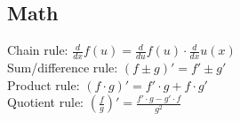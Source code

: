 \subsection{Math}
Chain rule: $\frac{d}{dx} f(u) = \frac{d}{du} f(u) \cdot \frac{d}{dx} u(x)$\\
Sum/difference rule: $(f \pm g)' = f' \pm g'$\\
Product rule: $(f \cdot g)' = f' \cdot g + f \cdot g'$\\
Quotient rule: $(\frac{f}{g})' = \frac{f' \cdot g - g' \cdot f}{g^2}$\\
 
 
